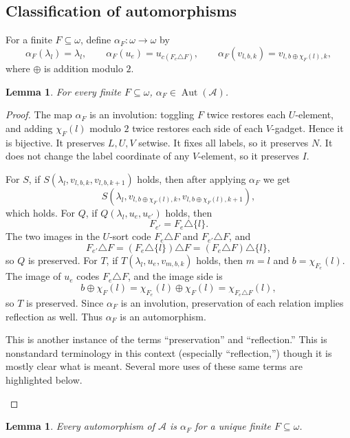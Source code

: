 \documentclass[12pt]{article}
\newtheorem{lemma}[theorem]{Lemma}
\theoremstyle{definition}
\theoremstyle{remark}
\newcommand{\Aut}{\operatorname{Aut}}
\newcommand{\review}[1]{\begin{reviewbox}#1\end{reviewbox}}
\begin{document}
\subsection{Classification of automorphisms}\label{sec:automorphisms}

For a finite \(F\subseteq\omega\), define \(\alpha_F:\omega\to\omega\) by
\[
\alpha_F(\lambda_l)=\lambda_l,\qquad
\alpha_F(u_e)=u_{c(F_e\triangle F)},\qquad
\alpha_F(v_{l,b,k})=v_{l,b\oplus\chi_F(l),k},
\]
where \(\oplus\) is addition modulo \(2\).

\begin{lemma}\label{lem:alpha-auto}
For every finite \(F\subseteq\omega\), \(\alpha_F\in\Aut(\mathcal A)\).
\end{lemma}

\begin{proof}
The map \(\alpha_F\) is an involution: toggling \(F\) twice restores each \(U\)-element, and adding \(\chi_F(l)\) modulo \(2\) twice restores each side of each \(V\)-gadget.  Hence it is bijective.  It preserves \(L,U,V\) setwise.  It fixes all labels, so it preserves \(N\).  It does not change the label coordinate of any \(V\)-element, so it preserves \(I\).

For \(S\), if \(S(\lambda_l,v_{l,b,k},v_{l,b,k+1})\) holds, then after applying \(\alpha_F\) we get
\[
S(\lambda_l,v_{l,b\oplus\chi_F(l),k},v_{l,b\oplus\chi_F(l),k+1}),
\]
which holds.  For \(Q\), if \(Q(\lambda_l,u_e,u_{e'})\) holds, then
\[
F_{e'}=F_e\triangle\{l\}.
\]
The two images in the \(U\)-sort code \(F_e\triangle F\) and \(F_{e'}\triangle F\), and
\[
F_{e'}\triangle F=(F_e\triangle\{l\})\triangle F=(F_e\triangle F)\triangle\{l\},
\]
so \(Q\) is preserved.  For \(T\), if \(T(\lambda_l,u_e,v_{m,b,k})\) holds, then \(m=l\) and \(b=\chi_{F_e}(l)\).  The image of \(u_e\) codes \(F_e\triangle F\), and the image side is
\[
b\oplus\chi_F(l)=\chi_{F_e}(l)\oplus\chi_F(l)=\chi_{F_e\triangle F}(l),
\]
so \(T\) is preserved.  Since \(\alpha_F\) is an involution, preservation of each relation implies reflection as well.  Thus \(\alpha_F\) is an automorphism.

\review{This is another instance of the terms ``preservation'' and ``reflection.'' This is nonstandard terminology in this context (especially ``reflection,'') though it is mostly clear what is meant. Several more uses of these same terms are highlighted below.}

\end{proof}

\begin{lemma}\label{lem:all-aut}
Every automorphism of \(\mathcal A\) is \(\alpha_F\) for a unique finite \(F\subseteq\omega\).
\end{lemma}
\end{document}
